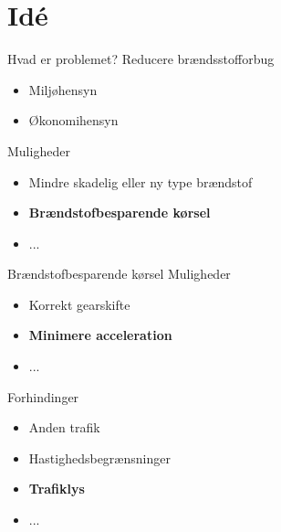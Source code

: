 \section{Idé}

\begin{frame}{Hvad er problemet?}
Reducere brændsstofforbug
\begin{itemize}
\item Miljøhensyn
\item Økonomihensyn
\end{itemize}

Muligheder
\begin{itemize}
\item Mindre skadelig eller ny type brændstof
\item \textbf{Brændstofbesparende kørsel}
\item ...
\end{itemize}
\end{frame}

\begin{frame}{Brændstofbesparende kørsel}
Muligheder
\begin{itemize}
\item Korrekt gearskifte
\item \textbf{Minimere acceleration}
\item ...
\end{itemize}

Forhindinger
\begin{itemize}
\item Anden trafik
\item Hastighedsbegrænsninger
\item \textbf{Trafiklys}
\item ...
\end{itemize}

\end{frame}

